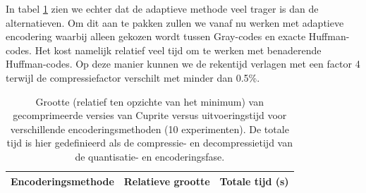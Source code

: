 In tabel \ref{table:encoding-timing} zien we echter dat de adaptieve methode veel trager is dan de alternatieven. Om dit aan te pakken zullen we vanaf nu werken met adaptieve encodering waarbij alleen gekozen wordt tussen Gray-codes en exacte Huffman-codes. Het kost namelijk relatief veel tijd om te werken met benaderende Huffman-codes. Op deze manier kunnen we de rekentijd verlagen met een factor 4 terwijl de compressiefactor verschilt met minder dan 0.5\%.

\begin{table}[H]
\centering
\begin{tabular}{|l|c|c|}
\hline
Encoderingsmethode & Relatieve grootte & Totale tijd (s) \\ \hline
                             
\end{tabular}
\caption{Grootte (relatief ten opzichte van het minimum) van gecomprimeerde versies van Cuprite versus uitvoeringstijd voor verschillende encoderingsmethoden (10 experimenten). De totale tijd is hier gedefinieerd als de compressie- en decompressietijd van de quantisatie- en encoderingsfase.}
\label{table:encoding-timing}
\end{table}